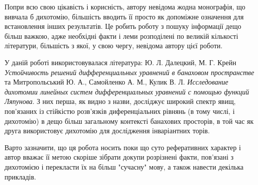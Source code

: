 \documentclass[14pt]{extarticle} %
\begin{document}
Попри всю свою цікавість і корисність, автору невідома жодна монографія, що вивчала б дихотомію, більшість вводить її просто як допоміжне
означення для встановлення інших результатів. Це робить роботу з пошуку інформації дещо більш важкою, адже необхідні факти і леми
розподілені по великій кількості літератури, більшість з якої, у свою чергу, невідома автору цієї роботи.

У даній роботі використовувалася література: Ю. Л. Далецкий, М. Г. Крейн
\emph{Устойчивость решений дифференциальных уравнений в банаховом пространстве} та Митропольський Ю. А., Самойленко А. М., Кулик В. Л.
\emph{Исследование дихотомии линейных систем дифференциальных уравнений с помощью функций Ляпунова}. З них перша, як видно з назви,
досліджує широкий спектр явищ, пов’язаних із стійкістю розв’язків диференціальних рівнянь (в тому числі, і дихотомію) в дещо
більш загальному контексті банахових просторів, в той час як друга використовує дихотомію для дослідження інваріантних торів.

Варто зазначити, що ця робота носить поки що суто реферативних характер і автор вважає її метою скоріше зібрати докупи розрізнені факти, пов’язані
з дихотомією і перекласти їх на більш "сучасну{}"{} мову, а також навести декілька прикладів.
\end{document}
